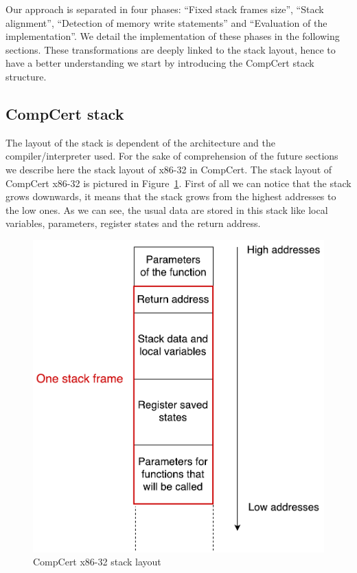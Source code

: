 \documentclass[11pt]{sdm}
\begin{document}
	Our approach is separated in four phases: ``Fixed stack frames size'', ``Stack alignment'', ``Detection of memory write statements'' and ``Evaluation of the implementation''. We detail the implementation of these phases in the following sections. These transformations are deeply linked to the stack layout, hence to have a better understanding we start by introducing the CompCert stack structure.

\subsection{CompCert stack}
	The layout of the stack is dependent of the architecture and the compiler/interpreter used. For the sake of comprehension of the future sections we describe here the stack layout of x86-32 in CompCert.
The stack layout of CompCert x86-32 is pictured in Figure~\ref{stack_layout}.
First of all we can notice that the stack grows downwards, it means that the stack grows from the highest addresses to the low ones.
As we can see, the usual data are stored in this stack like local variables, parameters, register states and the return address.

\begin{figure}[!ht]
\centering
\includegraphics[scale=0.55]{images/stack_layout.pdf}
\caption{CompCert x86-32 stack layout}
\label{stack_layout}
\end{figure}
\end{document}
